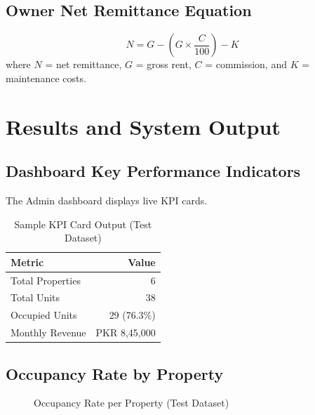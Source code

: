 \documentclass[conference]{IEEEtran}
\begin{document}
\subsection{Owner Net Remittance Equation}
\begin{equation}
N = G - \left(G \times \frac{C}{100}\right) - K
\label{eq:settlement}
\end{equation}
\noindent where $N$ = net remittance, $G$ = gross rent, $C$ = commission, and $K$ = maintenance costs.

\section{Results and System Output}

\subsection{Dashboard Key Performance Indicators}
The Admin dashboard displays live KPI cards.

\begin{table}[h]
\centering
\caption{Sample KPI Card Output (Test Dataset)}
\label{tab:kpi}
\begin{tabular}{|l|r|}
\hline
\textbf{Metric} & \textbf{Value} \\
\hline
Total Properties & 6 \\
Total Units & 38 \\
Occupied Units & 29 (76.3\%) \\
Monthly Revenue & PKR 8,45,000 \\
\hline
\end{tabular}
\end{table}

\subsection{Occupancy Rate by Property}

\begin{figure}[h]
\centering
{}
\caption{Occupancy Rate per Property (Test Dataset)}
\label{fig:occupancy}
\end{figure}
\end{document}
